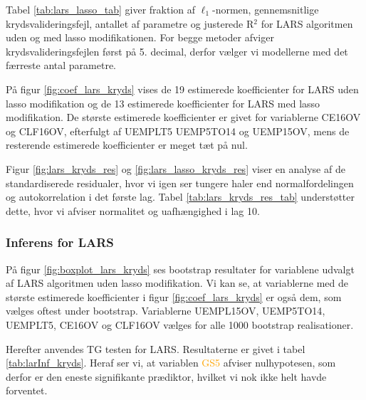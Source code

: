 
Tabel \ref{tab:lars_lasso_tab} giver fraktion af \(\ell_1\)-normen, gennemsnitlige krydsvalideringsfejl, antallet af parametre og justerede R$^2$ for LARS algoritmen uden og med lasso modifikationen. 
For begge metoder afviger krydsvalideringsfejlen først på 5. decimal, derfor vælger vi modellerne med det færreste antal parametre. 
%

%
På figur \ref{fig:coef_lars_kryds} vises de 19 estimerede koefficienter for LARS uden lasso modifikation og de 13 estimerede koefficienter for LARS med lasso modifikation. 
De største estimerede koefficienter er givet for variablerne \textcolor{blue3}{CE16OV} og \textcolor{blue3}{CLF16OV}, efterfulgt af \textcolor{blue3}{UEMPLT5} \textcolor{blue3}{UEMP5TO14} og \textcolor{blue3}{UEMP15OV}, mens de resterende estimerede koefficienter er meget tæt på nul. 


Figur \ref{fig:lars_kryds_res} og \ref{fig:lars_lasso_kryds_res} viser en analyse af de standardiserede residualer, hvor vi igen ser tungere haler end normalfordelingen og autokorrelation i det første lag. 
Tabel \ref{tab:lars_kryds_res_tab} understøtter dette, hvor vi afviser normalitet og uafhængighed i lag 10. 

\newpage
\subsubsection{Inferens for LARS}
På figur \ref{fig:boxplot_lars_kryds} ses bootstrap resultater for variablene udvalgt af LARS algoritmen uden lasso modifikation. 
Vi kan se, at variablerne med de største estimerede koefficienter i figur \ref{fig:coef_lars_kryds} er også dem, som vælges oftest under bootstrap. 
Variablerne \textcolor{blue3}{UEMPL15OV}, \textcolor{blue3}{UEMP5TO14}, \textcolor{blue3}{UEMPLT5}, \textcolor{blue3}{CE16OV} og \textcolor{blue3}{CLF16OV} vælges for alle 1000 bootstrap realisationer.


Herefter anvendes TG testen for LARS.
Resultaterne er givet i tabel \ref{tab:larInf_kryds}.
Heraf ser vi, at variablen \textcolor{orange}{GS5} afviser nulhypotesen, som derfor er den eneste signifikante prædiktor, hvilket vi nok ikke helt havde forventet. 
%


